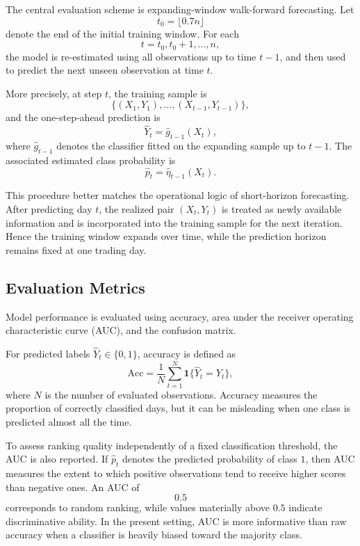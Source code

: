 \documentclass[11pt,a4paper]{article}
\begin{document}
	The central evaluation scheme is expanding-window walk-forward forecasting. Let
	\[
	t_0 = \lfloor 0.7n \rfloor
	\]
	denote the end of the initial training window. For each
	\[
	t = t_0, t_0+1, \dots, n,
	\]
	the model is re-estimated using all observations up to time \(t-1\), and then used to predict the next unseen observation at time \(t\).
	
	More precisely, at step \(t\), the training sample is
	\[
	\{(X_1,Y_1),\dots,(X_{t-1},Y_{t-1})\},
	\]
	and the one-step-ahead prediction is
	\[
	\widehat{Y}_t = \widehat{g}_{t-1}(X_t),
	\]
	where \(\widehat{g}_{t-1}\) denotes the classifier fitted on the expanding sample up to \(t-1\). The associated estimated class probability is
	\[
	\widehat{p}_t = \widehat{\eta}_{t-1}(X_t).
	\]
	
	This procedure better matches the operational logic of short-horizon forecasting. After predicting day \(t\), the realized pair \((X_t,Y_t)\) is treated as newly available information and is incorporated into the training sample for the next iteration. Hence the training window expands over time, while the prediction horizon remains fixed at one trading day.
	
	\subsection{Evaluation Metrics}
	
	Model performance is evaluated using accuracy, area under the receiver operating characteristic curve (AUC), and the confusion matrix.
	
	For predicted labels \(\widehat{Y}_t \in \{0,1\}\), accuracy is defined as
	\[
	\mathrm{Acc}
	=
	\frac{1}{N}\sum_{t=1}^{N} \mathbf{1}\{\widehat{Y}_t = Y_t\},
	\]
	where \(N\) is the number of evaluated observations. Accuracy measures the proportion of correctly classified days, but it can be misleading when one class is predicted almost all the time.
	
	To assess ranking quality independently of a fixed classification threshold, the AUC is also reported. If \(\widehat{p}_t\) denotes the predicted probability of class \(1\), then AUC measures the extent to which positive observations tend to receive higher scores than negative ones. An AUC of
	\[
	0.5
	\]
	corresponds to random ranking, while values materially above \(0.5\) indicate discriminative ability. In the present setting, AUC is more informative than raw accuracy when a classifier is heavily biased toward the majority class.
	
\end{document}
